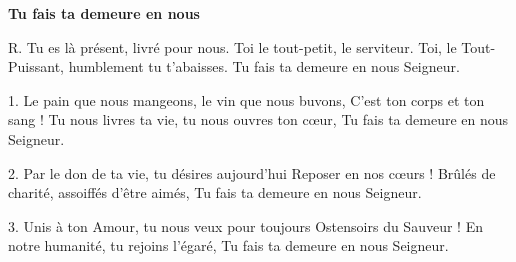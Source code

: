 \textbf{Tu fais ta demeure en nous}

R. Tu es là présent, livré pour nous. Toi le tout-petit, le serviteur.
Toi, le Tout-Puissant, humblement tu t’abaisses. Tu fais ta demeure en nous Seigneur.

1. Le pain que nous mangeons, le vin que nous buvons, C’est ton corps et ton sang ! Tu nous livres ta vie, tu nous ouvres ton cœur, Tu fais ta demeure en nous Seigneur.

2. Par le don de ta vie, tu désires aujourd’hui Reposer en nos cœurs !
Brûlés de charité, assoiffés d’être aimés, Tu fais ta demeure en nous Seigneur.

3. Unis à ton Amour, tu nous veux pour toujours Ostensoirs du Sauveur !
En notre humanité, tu rejoins l’égaré,
Tu fais ta demeure en nous Seigneur.
